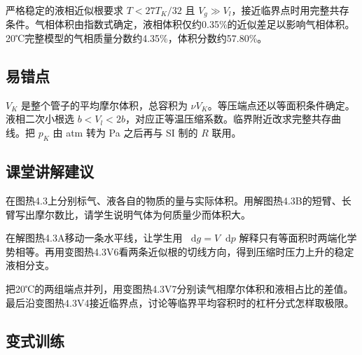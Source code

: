 \documentclass[UTF8,fontset=fandol,a4paper,11pt]{ctexart}
\newcommand{\dd}{\mathop{}\!\mathrm{d}}
\begin{document}
严格稳定的液相近似根要求 $T<27T_K/32$ 且 $V_g\gg V_l$，接近临界点时用完整共存条件。气相体积由指数式确定，液相体积仅约0.35\%的近似差足以影响气相体积。20℃完整模型的气相质量分数约4.35\%，体积分数约57.80\%。



\subsection*{易错点}

$V_K$ 是整个管子的平均摩尔体积，总容积为 $\nu V_K$。等压端点还以等面积条件确定。液相二次小根选 $b<V_l<2b$，对应正等温压缩系数。临界附近改求完整共存曲线。把 $p_K$ 由 atm 转为 Pa 之后再与 SI 制的 $R$ 联用。



\subsection*{课堂讲解建议}

在图热4.3上分别标气、液各自的物质的量与实际体积。用解图热4.3B的短臂、长臂写出摩尔数比，请学生说明气体为何质量少而体积大。

在解图热4.3A移动一条水平线，让学生用 $\dd g=V\dd p$ 解释只有等面积时两端化学势相等。再用变图热4.3V6看两条近似根的切线方向，得到压缩时压力上升的稳定液相分支。

把20℃的两组端点并列，用变图热4.3V7分别读气相摩尔体积和液相占比的差值。最后沿变图热4.3V4接近临界点，讨论等临界平均容积时的杠杆分式怎样取极限。



\subsection*{变式训练}
\end{document}
